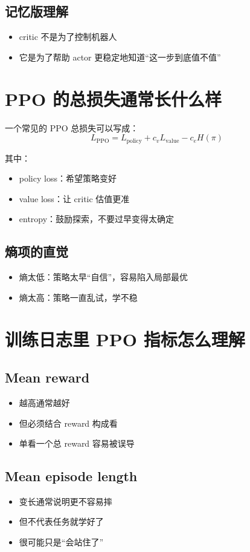 \documentclass[11pt,a4paper]{article}
\begin{document}
\subsection{记忆版理解}
\begin{itemize}
\item critic 不是为了控制机器人
\item 它是为了帮助 actor 更稳定地知道“这一步到底值不值”
\end{itemize}

\section{PPO 的总损失通常长什么样}
一个常见的 PPO 总损失可以写成：
\[
L_{\text{PPO}} = L_{\text{policy}} + c_v L_{\text{value}} - c_e H(\pi)
\]

其中：
\begin{itemize}
\item policy loss：希望策略变好
\item value loss：让 critic 估值更准
\item entropy：鼓励探索，不要过早变得太确定
\end{itemize}

\subsection{熵项的直觉}
\begin{itemize}
\item 熵太低：策略太早“自信”，容易陷入局部最优
\item 熵太高：策略一直乱试，学不稳
\end{itemize}

\section{训练日志里 PPO 指标怎么理解}
\subsection*{Mean reward}
\begin{itemize}
\item 越高通常越好
\item 但必须结合 reward 构成看
\item 单看一个总 reward 容易被误导
\end{itemize}

\subsection*{Mean episode length}
\begin{itemize}
\item 变长通常说明更不容易摔
\item 但不代表任务就学好了
\item 很可能只是“会站住了”
\end{itemize}
\end{document}

